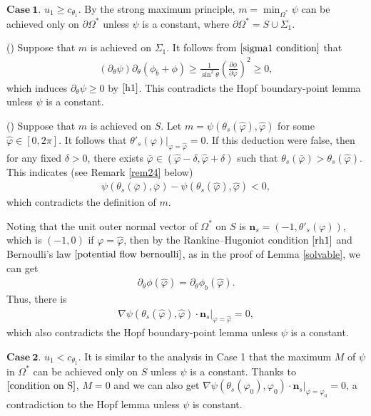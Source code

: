 \documentclass[10pt,a4paper]{amsart}
\numberwithin{equation}{section}
\begin{document}
$\mathbf{Case~1.}$ 
$u_1\geq c_{\theta_1}$. By the strong maximum principle, $m = \min_{\Omega^*} \psi$ can be achieved only on $\partial\Omega^*$ unless $\psi$ is a constant, where $\partial \Omega^*=S\cup \Sigma_1$.

() Suppose that $m$ is achieved on $\Sigma_1 $. It follows from $\eqref{sigma1 condition}$ that
\begin{align}
	(\partial_\theta \psi)\partial_\theta(\phi_b+\phi)\geq\frac{1}{\sin^2\theta}(\frac{\partial\phi}{\partial\varphi})^2\geq0,
\end{align}
which induces $\partial_\theta \psi\geq0$ by $\eqref{h1}$. This contradicts the Hopf boundary-point lemma unless $\psi$ is a constant.

() Suppose that $m$ is achieved on $S$. Let $m=\psi(\theta_s(\hat{\varphi}),\hat{\varphi})$ for some $\hat{\varphi}\in[0,2\pi]$. It follows that $\theta'_s(\varphi)|_{\varphi=\hat{\varphi}}=0$. If this deduction were false, then
for any fixed $\delta>0$, there exists $\bar{\varphi}\in (\hat{\varphi}-\delta, \hat{\varphi}+\delta)$ such that $\theta_{s}(\bar{\varphi})>\theta_s(\hat{\varphi})$. This indicates (see Remark \ref{rem24} below)
\begin{align}\label{contradiction1}
	\psi(\theta_{s}(\bar{\varphi}),\bar{\varphi})-\psi(\theta_s(\hat{\varphi}),\hat{\varphi})<0,
\end{align} 
which contradicts the definition of $m$. 

Noting that the unit outer normal vector of $\Omega^*$ on $S$ is $\mathbf{n}_s=(-1,\theta'_s(\varphi))$, which is $(-1,0)$ if $\varphi=\hat{\varphi}$, then by the Rankine–Hugoniot condition $\eqref{rh1}$ and Bernoulli's law $\eqref{potential flow bernoulli}$, as in the proof of Lemma \ref{solvable}, we can get
\begin{align}
	\partial_\theta\phi(\hat{\varphi})=\partial_\theta\phi_b(\hat{\varphi}).
\end{align}
Thus, there is
\begin{align}
	\nabla\psi(\theta_s(\hat{\varphi}),\hat{\varphi})\cdot \mathbf{n}_s|_{\varphi=\hat{\varphi}}=0,
\end{align}
which also contradicts the Hopf boundary-point lemma unless $\psi$ is a constant.

$\mathbf{Case~2. }$
$u_1 < c_{\theta_1}$. It is similar to the analysis in Case 1 that the maximum $M$ of $\psi$ in $\Omega^*$ can be achieved only on $S$ unless $\psi$ is a constant. Thanks to $\eqref{condition on S}$, $M = 0$ and we can also get $\nabla \psi(\theta_s(\varphi_0),\varphi_0)\cdot\mathbf{n}_s|_{\varphi=\varphi_0} = 0$, a contradiction to the Hopf lemma unless $\psi$ is constant.
\end{document}
